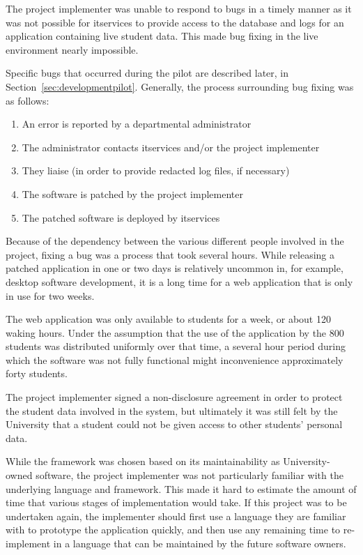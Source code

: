 
The project implementer was unable to respond to bugs in a timely manner as it
was not possible for \gls{itservices} to provide access to the database and
logs for an application containing live student data. This made bug fixing in
the live environment nearly impossible.

Specific bugs that occurred during the pilot are described later, in
Section~\ref{sec:developmentpilot}. Generally, the process surrounding bug fixing
was as follows:

\begin{enumerate}
  \item An error is reported by a departmental administrator
  \item The administrator contacts \gls{itservices} and/or the project implementer
  \item They liaise (in order to provide redacted log files, if necessary)
  \item The software is patched by the project implementer
  \item The patched software is deployed by \gls{itservices}
\end{enumerate}

Because of the dependency between the various different people involved in the
project, fixing a bug was a process that took several hours. While releasing a
patched application in one or two days is relatively uncommon in, for example,
desktop software development, it is a long time for a web application that is
only in use for two weeks.

The web application was only available to students for a week, or about 120
waking hours. Under the assumption that the use of the application by the 800
students was distributed uniformly over that time, a several hour period during
which the software was not fully functional might inconvenience approximately
forty students.

The project implementer signed a non-disclosure agreement in order to protect
the student data involved in the system, but ultimately it was still felt by
the University that a student could not be given access to other students'
personal data.


While the framework was chosen based on its maintainability as
University-owned software, the project implementer was not particularly
familiar with the underlying language and framework. This made it hard to
estimate the amount of time that various stages of implementation would take.
If this project was to be undertaken again, the implementer should first use a
language they are familiar with to prototype the application quickly, and then
use any remaining time to re-implement in a language that can be maintained by
the future software owners.

